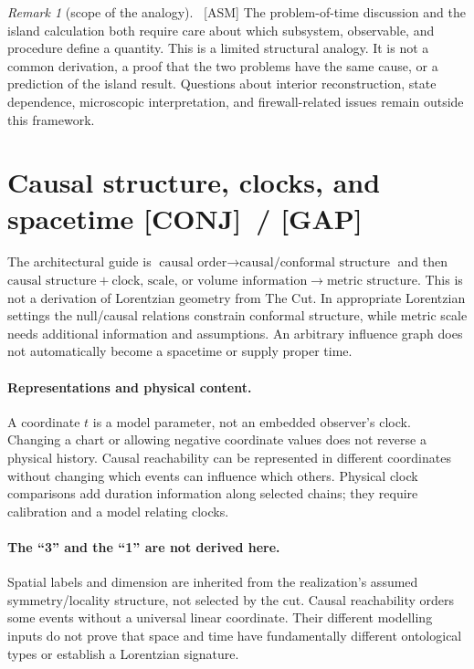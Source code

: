 \documentclass[11pt]{article}
\newcommand{\asm}{\textcolor{blue!70!black}{\textsf{\small[ASM]}}}
\newcommand{\conj}{\textcolor{orange!80!black}{\textsf{\small[CONJ]}}}
\newcommand{\post}{\textcolor{purple!70!black}{\textsf{\small[POST]}}}
\newcommand{\gap}{\textcolor{red!75!black}{\textsf{\small[GAP]}}}
\def\conj{[CONJ]}\def\post{[POST]}\def\gap{[GAP]}%
\def\quad{ }\def\normalsize{}%
\theoremstyle{definition}
\theoremstyle{remark}
\newtheorem*{remark}{Remark}
\begin{document}
\begin{remark}[scope of the analogy]{\normalfont\ \asm}
The problem-of-time discussion and the island calculation both require care about which subsystem, observable, and procedure define a quantity. This is a limited structural analogy. It is not a common derivation, a proof that the two problems have the same cause, or a prediction of the island result. Questions about interior reconstruction, state dependence, microscopic interpretation, and firewall-related issues remain outside this framework.
\end{remark}


\section{Causal structure, clocks, and spacetime \quad{\normalsize\conj\ / \gap}}\label{sec:spacetime}

The architectural guide is $\text{causal order}\to\text{causal/conformal structure}$ and then $\text{causal structure}+\text{clock, scale, or volume information}\to\text{metric structure}$. This is not a derivation of Lorentzian geometry from The Cut. In appropriate Lorentzian settings the null/causal relations constrain conformal structure, while metric scale needs additional information and assumptions. An arbitrary influence graph does not automatically become a spacetime or supply proper time.

\paragraph{Representations and physical content.}
A coordinate $t$ is a model parameter, not an embedded observer's clock. Changing a chart or allowing negative coordinate values does not reverse a physical history. Causal reachability can be represented in different coordinates without changing which events can influence which others. Physical clock comparisons add duration information along selected chains; they require calibration and a model relating clocks.

\paragraph{The ``3'' and the ``1'' are not derived here.}
Spatial labels and dimension are inherited from the realization's assumed symmetry/locality structure, not selected by the cut. Causal reachability orders some events without a universal linear coordinate. Their different modelling inputs do not prove that space and time have fundamentally different ontological types or establish a Lorentzian signature.
\end{document}
